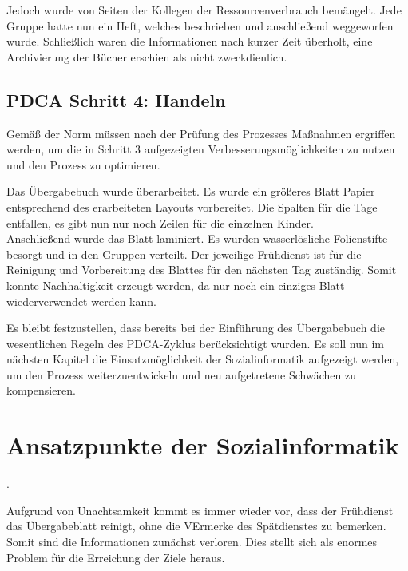 Jedoch wurde von Seiten der Kollegen der Ressourcenverbrauch bemängelt. Jede Gruppe hatte nun ein Heft, welches beschrieben und anschließend weggeworfen wurde. Schließlich waren die Informationen nach kurzer Zeit überholt, eine Archivierung der Bücher erschien als nicht zweckdienlich.

\subsection{PDCA Schritt 4: Handeln}

Gemäß der Norm \citep[vgl.][14]{ISO9001} müssen nach der Prüfung des Prozesses Maßnahmen ergriffen werden, um die in Schritt 3 aufgezeigten Verbesserungsmöglichkeiten zu nutzen und den Prozess zu optimieren. 

Das Übergabebuch wurde überarbeitet. Es wurde ein größeres Blatt Papier entsprechend des erarbeiteten Layouts vorbereitet. Die Spalten für die Tage entfallen, es gibt nun nur noch Zeilen für die einzelnen Kinder.\\
Anschließend wurde das Blatt laminiert.
Es wurden wasserlösliche Folienstifte besorgt und in den Gruppen verteilt. Der jeweilige Frühdienst ist für die Reinigung und Vorbereitung des Blattes für den nächsten Tag zuständig. Somit konnte Nachhaltigkeit erzeugt werden, da nur noch ein einziges Blatt wiederverwendet werden kann.

Es bleibt festzustellen, dass bereits bei der Einführung des Übergabebuch die wesentlichen Regeln des PDCA-Zyklus berücksichtigt wurden. Es soll nun im nächsten Kapitel die Einsatzmöglichkeit der Sozialinformatik aufgezeigt werden, um den Prozess weiterzuentwickeln und neu aufgetretene Schwächen zu kompensieren.

\newpage
\section{Ansatzpunkte der Sozialinformatik}

 \citep[][24]{kreidenweis2012}.

Aufgrund von Unachtsamkeit kommt es immer wieder vor, dass der Frühdienst das Übergabeblatt reinigt, ohne die VErmerke des Spätdienstes zu bemerken. Somit sind die Informationen zunächst verloren. Dies stellt sich als enormes Problem für die Erreichung der Ziele heraus.


